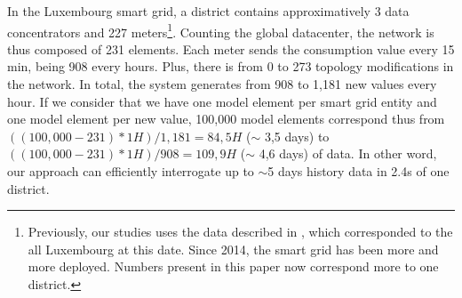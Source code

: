 In the Luxembourg smart grid, a district contains approximatively 3 data concentrators and 227 meters\footnote{Previously, our studies uses the data described in \cite{DBLP:conf/smartgridcomm/0001FKTPTR14}, which corresponded to the all Luxembourg at this date. Since 2014, the smart grid has been more and more deployed. Numbers present in this paper now correspond more to one district.}.
Counting the global datacenter, the network is thus composed of 231 elements.
Each meter sends the consumption value every 15 min, being 908 every hours.
Plus, there is from 0 to 273 topology modifications in the network.
In total, the system generates from 908 to 1,181 new values every hour.
If we consider that we have one model element per smart grid entity and one model element per new value, 100,000 model elements correspond thus from $((100,000 - 231) * 1H ) / 1,181 = 84,5H$ ($\sim$ 3,5 days) to $((100,000 - 231) * 1H ) / 908 = 109,9H$ ($\sim$ 4,6 days) of data.
In other word, our approach can efficiently interrogate up to $\sim$5 days history data in 2.4s of one district.

